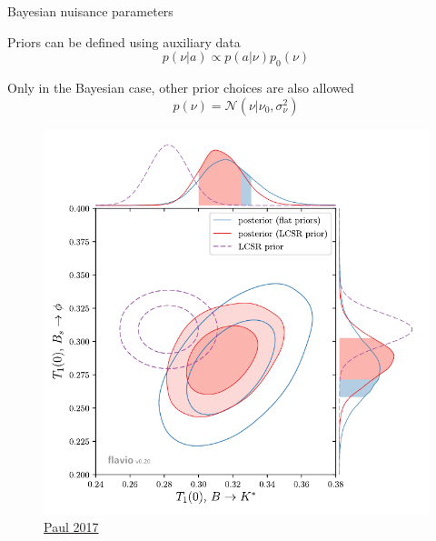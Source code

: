 \documentclass[
aspectratio=169,
14pt,
professionalfonts
]{beamer}
\begin{document}
\begin{frame}{Bayesian nuisance parameters}
    \begin{minipage}{0.6\textwidth}
        Priors can be defined using auxiliary data
        $$p(\nu|a) \propto p(a|\nu) p_0(\nu)$$
        
        Only in the Bayesian case, other prior choices are also allowed
        $$ p(\nu) = \mathcal{N}(\nu | \nu_0, \sigma_\nu^2)$$
        
    \end{minipage}
    \begin{minipage}{0.39\textwidth}
        \begin{figure}
            \centering
            \includegraphics[width=\textwidth]{../plots/straub-posterior.pdf}
            \flushright \small
        \href{https://arxiv.org/pdf/2311.14647}{Paul 2017}
        \end{figure}
    \end{minipage}
\end{frame}
\end{document}
